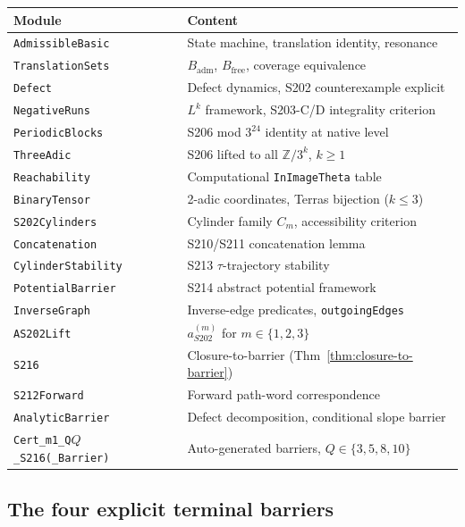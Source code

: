 \documentclass[11pt,a4paper]{article}
\theoremstyle{plain}
\theoremstyle{definition}
\newcommand{\ZZ}{\mathbb{Z}}
\newcommand{\aSat}{a_{S202}^{(m)}}
\begin{document}
\begin{center}\footnotesize
\begin{tabular}{ll}
\toprule
Module & Content \\
\midrule
\texttt{AdmissibleBasic} & State machine, translation identity, resonance \\
\texttt{TranslationSets} & $B_{\mathrm{adm}}$, $B_{\mathrm{free}}$, coverage equivalence \\
\texttt{Defect} & Defect dynamics, S202 counterexample explicit \\
\texttt{NegativeRuns} & $L^k$ framework, S203-C/D integrality criterion \\
\texttt{PeriodicBlocks} & S206 mod $3^{24}$ identity at native level \\
\texttt{ThreeAdic} & S206 lifted to all $\ZZ / 3^k$, $k \ge 1$ \\
\texttt{Reachability} & Computational \texttt{InImageTheta} table \\
\texttt{BinaryTensor} & 2-adic coordinates, Terras bijection ($k \le 3$) \\
\texttt{S202Cylinders} & Cylinder family $C_m$, accessibility criterion \\
\texttt{Concatenation} & S210/S211 concatenation lemma \\
\texttt{CylinderStability} & S213 $\tau$-trajectory stability \\
\texttt{PotentialBarrier} & S214 abstract potential framework \\
\texttt{InverseGraph} & Inverse-edge predicates, \texttt{outgoingEdges} \\
\texttt{AS202Lift} & $\aSat$ for $m \in \{1, 2, 3\}$ \\
\texttt{S216} & Closure-to-barrier (Thm~\ref{thm:closure-to-barrier}) \\
\texttt{S212Forward} & Forward path-word correspondence \\
\texttt{AnalyticBarrier} & Defect decomposition, conditional slope barrier \\
\texttt{Cert\_m1\_Q$Q$\_S216(\_Barrier)} & Auto-generated barriers, $Q \in \{3,5,8,10\}$ \\
\bottomrule
\end{tabular}
\end{center}

\subsection{The four explicit terminal barriers}
\end{document}
